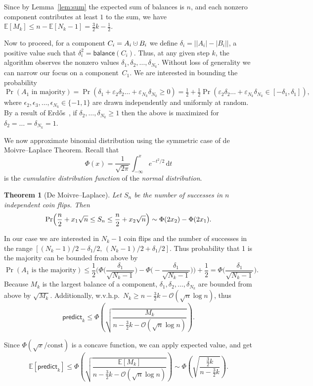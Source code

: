 \documentclass{article}[11pt,a4paper]
\newtheorem{theorem}[definition]{Theorem}
\newcommand{\bigo}{\mathcal{O}}
\newcommand{\balance}{\mathsf{balance}}
\newcommand{\predict}{\mathsf{predict}}
\newcommand{\E}{\mathbb{E}}
\newcommand{\cupdot}{\mathbin{\mathaccent\cdot\cup}}
\begin{document}
Since by Lemma~\ref{lem:sum} the expected sum of balances is $n$, and each nonzero component contributes at least $1$ to the sum, we have
$\E[M_k] \le n - \E[N_k-1] = \frac32k-\frac12$.

Now to proceed, for a component $C_i = A_i \cupdot B_i$ we define $\delta_i = \left||A_i| - |B_i|\right|$, a positive value such that $\delta_i^2 = \balance(C_i)$. Thus, at any given step $k$, the algorithm observes the nonzero values $\delta_1,\delta_2,\ldots,\delta_{N_k}$. Without loss of generality we can narrow our focus on a component~$C_1$. We are interested in bounding the probability
\[ \Pr(A_1 \text{ in majority}) = \Pr(  \delta_1 + \varepsilon_2 \delta_2 \ldots + \varepsilon_{N_k} \delta_{N_k} \ge 0 ) = \tfrac12 + \tfrac12 \Pr( \varepsilon_2 \delta_2 \ldots + \varepsilon_{N_k} \delta_{N_k} \in [-\delta_1,\delta_1]),\]
where $\epsilon_2,\epsilon_3,\ldots,\epsilon_{N_k} \in \{-1,1\}$ are drawn independently and uniformly at random.
By a result of Erd\H{o}s~\cite{erdos1945}, if $\delta_2, \ldots, \delta_{N_k} \ge 1$ then the above is maximized for $\delta_2=\ldots=\delta_{N_k}=1$.

We now approximate binomial distribution using the symmetric case of de Moivre--Laplace Theorem. Recall that 
\[\Phi(x) = \frac{1}{\sqrt{2\pi}} \int_{-\infty}^x \! e^{-t^2/2} \, \mathrm{d}t\]
is the \emph{cumulative distribution function} of the \emph{normal distribution}.
\begin{theorem}[De Moivre--Laplace]
Let $S_n$ be the number of successes in $n$ independent coin flips. Then
\[ \Pr\Bigl(\frac{n}{2} + x_1\sqrt{n} \le S_n \le \frac{n}{2} + x_2 \sqrt{n}\Bigr) \sim \Phi(2x_2) - \Phi(2x_1). \]
\end{theorem}
In our case we are interested in $N_k-1$ coin flips and the number of successes in the range $[(N_k-1)/2-\delta_1/2,\,(N_k-1)/2+\delta_1/2]$. Thus probability that 1 is the majority can be bounded from above by
\[ \Pr(A_1 \text{ is the majority}) \le \frac12\biggl(\Phi\biggl(\frac{\delta_1}{\sqrt{N_k-1}}\biggr) - \Phi\biggl(-\frac{\delta_1}{\sqrt{N_k-1}}\biggr)\biggr)+\frac12 = \Phi\biggl(\frac{\delta_1}{\sqrt{N_k-1}}\biggr).\]
Because $M_k$ is the largest balance of a component, $\delta_1,\delta_2,\ldots,\delta_{N_k}$ are bounded from above by $\sqrt{M_k}$. Additionally, w.v.h.p.\ $N_k \ge n-\frac32k - \bigo(\sqrt{n} \log n)$, thus
\[\predict_k \le \Phi\left(\sqrt{\frac{M_k}{n-\frac32k - \bigo(\sqrt{n} \log n)}}\right).\]

Since $\Phi(\sqrt{x}/\text{const})$ is a concave function, we can apply expected value, and get
\[ \E[\predict_k] \le \Phi\left(\sqrt{\frac{\E[M_k]}{n-\frac32k - \bigo(\sqrt{n} \log n)}}\right) \sim \Phi\left(\sqrt{\frac{\frac32k}{n-\frac32k}}\right). \]
\end{document}
